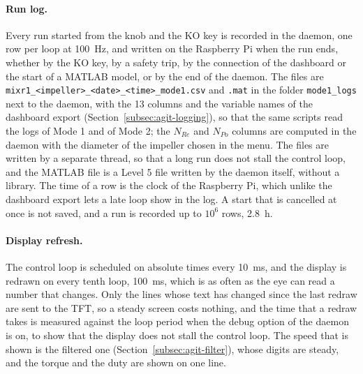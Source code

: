 \paragraph{Run log.}
Every run started from the knob and the KO key is recorded in the daemon, one row per loop at 100~Hz, and written on the Raspberry Pi when the run ends, whether by the KO key, by a safety trip, by the connection of the dashboard or the start of a MATLAB model, or by the end of the daemon. The files are \texttt{mixr1\_<impeller>\_<date>\_<time>\_mode1.csv} and \texttt{.mat} in the folder \texttt{mode1\_logs} next to the daemon, with the 13 columns and the variable names of the dashboard export (Section~\ref{subsec:agit-logging}), so that the same scripts read the logs of Mode 1 and of Mode 2; the $N_{Re}$ and $N_{Po}$ columns are computed in the daemon with the diameter of the impeller chosen in the menu. The files are written by a separate thread, so that a long run does not stall the control loop, and the MATLAB file is a Level 5 file written by the daemon itself, without a library. The time of a row is the clock of the Raspberry Pi, which unlike the dashboard export lets a late loop show in the log. A start that is cancelled at once is not saved, and a run is recorded up to $10^{6}$ rows, 2.8~h.

\paragraph{Display refresh.}
The control loop is scheduled on absolute times every 10~ms, and the display is redrawn on every tenth loop, 100~ms, which is as often as the eye can read a number that changes. Only the lines whose text has changed since the last redraw are sent to the TFT, so a steady screen costs nothing, and the time that a redraw takes is measured against the loop period when the debug option of the daemon is on, to show that the display does not stall the control loop. The speed that is shown is the filtered one (Section~\ref{subsec:agit-filter}), whose digits are steady, and the torque and the duty are shown on one line.

